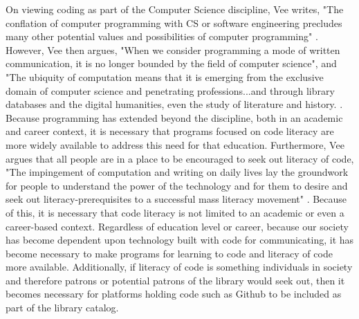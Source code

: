 On viewing coding as part of the Computer Science discipline, Vee writes, "The conflation of computer programming with CS or software engineering precludes many other potential values and possibilities of computer programming" \cite{vee2017coding}. However, Vee then argues, "When we consider programming a mode of written communication, it is no longer bounded by the field of computer science"\cite{vee2017coding}, and "The ubiquity of computation means that it is emerging from the exclusive domain of computer science and penetrating professions...and through library databases and the digital humanities, even the study of literature and history. \cite{vee2017coding}. Because programming has extended beyond the discipline, both in an academic and career context, it is necessary that programs focused on code literacy are more widely available to address this need for that education. Furthermore, Vee argues that all people are in a place to be encouraged to seek out literacy of code, "The impingement of computation and writing on daily lives lay the groundwork for people to understand the power of the technology and for them to desire and seek out literacy-prerequisites to a successful mass literacy movement" \cite{vee2017coding}. Because of this, it is necessary that code literacy is not limited to an academic or even a career-based context. Regardless of education level or career, because our society has become dependent upon technology built with code for communicating, it has become necessary to make programs for learning to code and literacy of code more available. Additionally, if literacy of code is something individuals in society and therefore patrons or potential patrons of the library would seek out, then it becomes necessary for platforms holding code such as Github to be included as part of the library catalog. 

